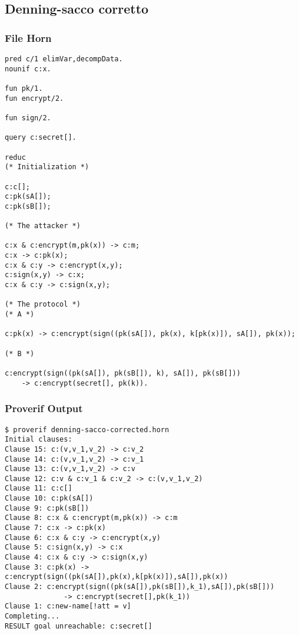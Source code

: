 \documentclass[11pt]{article}
\begin{document}
\subsection{Denning-sacco corretto}
\label{sec:orga886a31}
\subsubsection{File Horn}
\label{sec:orgb1bf940}
\begin{verbatim}
pred c/1 elimVar,decompData.
nounif c:x.

fun pk/1.
fun encrypt/2.

fun sign/2.

query c:secret[].

reduc
(* Initialization *)

c:c[];
c:pk(sA[]);
c:pk(sB[]);

(* The attacker *)

c:x & c:encrypt(m,pk(x)) -> c:m;
c:x -> c:pk(x);
c:x & c:y -> c:encrypt(x,y);
c:sign(x,y) -> c:x;
c:x & c:y -> c:sign(x,y);

(* The protocol *)
(* A *)

c:pk(x) -> c:encrypt(sign((pk(sA[]), pk(x), k[pk(x)]), sA[]), pk(x));

(* B *)

c:encrypt(sign((pk(sA[]), pk(sB[]), k), sA[]), pk(sB[]))
    -> c:encrypt(secret[], pk(k)).
\end{verbatim}

\subsubsection{Proverif Output}
\label{sec:org2256546}
\begin{verbatim}
$ proverif denning-sacco-corrected.horn
Initial clauses:
Clause 15: c:(v,v_1,v_2) -> c:v_2
Clause 14: c:(v,v_1,v_2) -> c:v_1
Clause 13: c:(v,v_1,v_2) -> c:v
Clause 12: c:v & c:v_1 & c:v_2 -> c:(v,v_1,v_2)
Clause 11: c:c[]
Clause 10: c:pk(sA[])
Clause 9: c:pk(sB[])
Clause 8: c:x & c:encrypt(m,pk(x)) -> c:m
Clause 7: c:x -> c:pk(x)
Clause 6: c:x & c:y -> c:encrypt(x,y)
Clause 5: c:sign(x,y) -> c:x
Clause 4: c:x & c:y -> c:sign(x,y)
Clause 3: c:pk(x) -> c:encrypt(sign((pk(sA[]),pk(x),k[pk(x)]),sA[]),pk(x))
Clause 2: c:encrypt(sign((pk(sA[]),pk(sB[]),k_1),sA[]),pk(sB[]))
              -> c:encrypt(secret[],pk(k_1))
Clause 1: c:new-name[!att = v]
Completing...
RESULT goal unreachable: c:secret[]
\end{verbatim}
\end{document}
